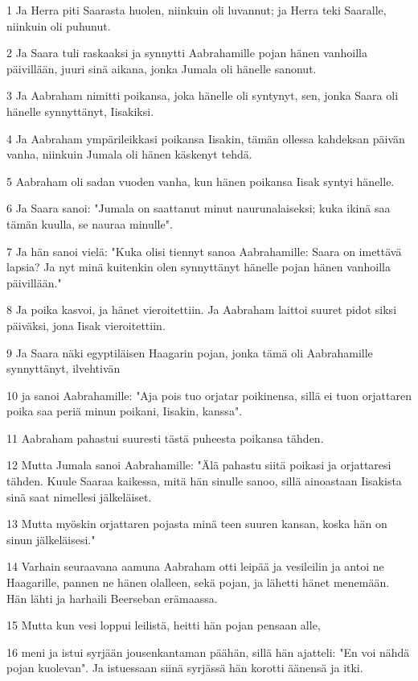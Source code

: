 \par 1 Ja Herra piti Saarasta huolen, niinkuin oli luvannut; ja Herra teki Saaralle, niinkuin oli puhunut.
\par 2 Ja Saara tuli raskaaksi ja synnytti Aabrahamille pojan hänen vanhoilla päivillään, juuri sinä aikana, jonka Jumala oli hänelle sanonut.
\par 3 Ja Aabraham nimitti poikansa, joka hänelle oli syntynyt, sen, jonka Saara oli hänelle synnyttänyt, Iisakiksi.
\par 4 Ja Aabraham ympärileikkasi poikansa Iisakin, tämän ollessa kahdeksan päivän vanha, niinkuin Jumala oli hänen käskenyt tehdä.
\par 5 Aabraham oli sadan vuoden vanha, kun hänen poikansa Iisak syntyi hänelle.
\par 6 Ja Saara sanoi: "Jumala on saattanut minut naurunalaiseksi; kuka ikinä saa tämän kuulla, se nauraa minulle".
\par 7 Ja hän sanoi vielä: "Kuka olisi tiennyt sanoa Aabrahamille: Saara on imettävä lapsia? Ja nyt minä kuitenkin olen synnyttänyt hänelle pojan hänen vanhoilla päivillään."
\par 8 Ja poika kasvoi, ja hänet vieroitettiin. Ja Aabraham laittoi suuret pidot siksi päiväksi, jona Iisak vieroitettiin.
\par 9 Ja Saara näki egyptiläisen Haagarin pojan, jonka tämä oli Aabrahamille synnyttänyt, ilvehtivän
\par 10 ja sanoi Aabrahamille: "Aja pois tuo orjatar poikinensa, sillä ei tuon orjattaren poika saa periä minun poikani, Iisakin, kanssa".
\par 11 Aabraham pahastui suuresti tästä puheesta poikansa tähden.
\par 12 Mutta Jumala sanoi Aabrahamille: "Älä pahastu siitä poikasi ja orjattaresi tähden. Kuule Saaraa kaikessa, mitä hän sinulle sanoo, sillä ainoastaan Iisakista sinä saat nimellesi jälkeläiset.
\par 13 Mutta myöskin orjattaren pojasta minä teen suuren kansan, koska hän on sinun jälkeläisesi."
\par 14 Varhain seuraavana aamuna Aabraham otti leipää ja vesileilin ja antoi ne Haagarille, pannen ne hänen olalleen, sekä pojan, ja lähetti hänet menemään. Hän lähti ja harhaili Beerseban erämaassa.
\par 15 Mutta kun vesi loppui leilistä, heitti hän pojan pensaan alle,
\par 16 meni ja istui syrjään jousenkantaman päähän, sillä hän ajatteli: "En voi nähdä pojan kuolevan". Ja istuessaan siinä syrjässä hän korotti äänensä ja itki.
